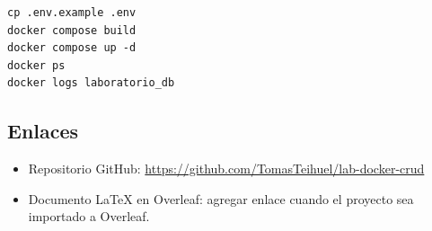 \documentclass[12pt]{article}
\begin{document}
\begin{verbatim}
cp .env.example .env
docker compose build
docker compose up -d
docker ps
docker logs laboratorio_db
\end{verbatim}

\subsection{Enlaces}

\begin{itemize}
    \item Repositorio GitHub: \url{https://github.com/TomasTeihuel/lab-docker-crud}
    \item Documento LaTeX en Overleaf: agregar enlace cuando el proyecto sea importado a Overleaf.
\end{itemize}
\end{document}
